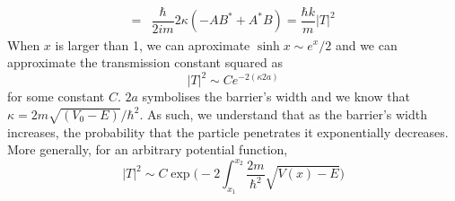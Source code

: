 \begin{thm}
\begin{align*}
=&\dfrac{\hbar }{2im}2\kappa (-AB^{*}+A^{*}B)=\dfrac{\hbar k}{m}|T|^2
\end{align*}
When $x$ is larger than 1, we can aproximate $\sinh x\sim e^{x}/2$ and we can approximate the transmission constant squared as
\[|T|^2\sim Ce^{-2(\kappa 2a)}\]
for some constant $C$. $2a$ symbolises the barrier's width and we know that $\kappa =2m\sqrt{(V_0-E)}/\hbar ^2$. As such, we understand that as the barrier's width increases, the probability that the particle penetrates it exponentially decreases. More generally, for an arbitrary potential function,
\[|T|^2\sim C\exp \Big(-2\int _{x_1}^{x_2}\dfrac{2m}{\hbar ^2}\sqrt{V(x)-E}\Big)\]

\end{thm}
\vspace{2ex}

